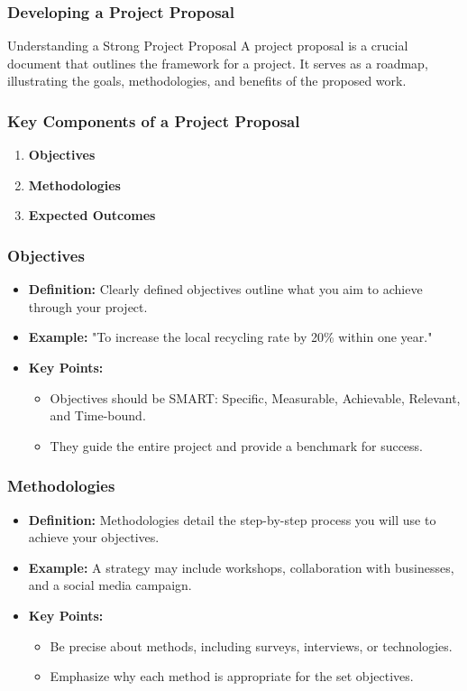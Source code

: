 \documentclass[aspectratio=169]{beamer}
\begin{document}
\begin{frame}[fragile]
    \frametitle{Developing a Project Proposal}
    \begin{block}{Understanding a Strong Project Proposal}
        A project proposal is a crucial document that outlines the framework for a project. It serves as a roadmap, illustrating the goals, methodologies, and benefits of the proposed work.
    \end{block}
\end{frame}

\begin{frame}[fragile]
    \frametitle{Key Components of a Project Proposal}
    \begin{enumerate}
        \item \textbf{Objectives}
        \item \textbf{Methodologies}
        \item \textbf{Expected Outcomes}
    \end{enumerate}
\end{frame}

\begin{frame}[fragile]
    \frametitle{Objectives}
    \begin{itemize}
        \item \textbf{Definition:} Clearly defined objectives outline what you aim to achieve through your project.
        \item \textbf{Example:} "To increase the local recycling rate by 20\% within one year."
        \item \textbf{Key Points:}
        \begin{itemize}
            \item Objectives should be SMART: Specific, Measurable, Achievable, Relevant, and Time-bound.
            \item They guide the entire project and provide a benchmark for success.
        \end{itemize}
    \end{itemize}
\end{frame}

\begin{frame}[fragile]
    \frametitle{Methodologies}
    \begin{itemize}
        \item \textbf{Definition:} Methodologies detail the step-by-step process you will use to achieve your objectives.
        \item \textbf{Example:} A strategy may include workshops, collaboration with businesses, and a social media campaign.
        \item \textbf{Key Points:}
        \begin{itemize}
            \item Be precise about methods, including surveys, interviews, or technologies.
            \item Emphasize why each method is appropriate for the set objectives.
        \end{itemize}
    \end{itemize}
\end{frame}
\end{document}
